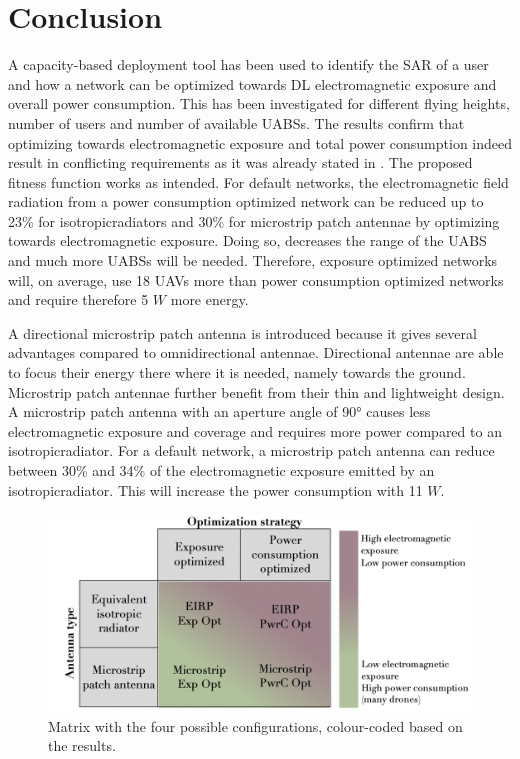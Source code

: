 \documentclass[twocolumn]{phdsymp} %
\begin{document}
\section{Conclusion}

A capacity-based deployment tool has been used to identify the \gls{SAR} of a user and how a network can be optimized 
towards \gls{DL} electromagnetic exposure and overall power consumption. This has been investigated for different flying heights,
number of users and number of available \gls{UABS}s.
The  results confirm that optimizing towards electromagnetic exposure and total power consumption indeed result in 
conflicting requirements as it was already stated in  \cite{J1}. The proposed fitness function works as intended. 
For default networks, the electromagnetic field radiation from a
power consumption optimized network can be reduced up to 23\% for \gls{isotropicradiator}s and 30\% for microstrip patch antennae 
by optimizing towards electromagnetic exposure. Doing so, decreases the range of the \gls{UABS} and much more \gls{UABS}s will be needed. 
Therefore, exposure optimized networks will, on average, use 18 \gls{UAV}s more than power consumption optimized networks
and require therefore 5 $W$ more energy.

A directional microstrip patch antenna is introduced because it gives several advantages compared to omnidirectional antennae.
Directional antennae are able to focus their energy there where it is needed, namely towards the ground. Microstrip patch antennae 
further benefit from their thin and lightweight design. 
A microstrip patch antenna with an aperture  angle of \ang{90} causes less electromagnetic exposure and coverage and requires more power compared to an \gls{isotropicradiator}.
For a default network, a microstrip patch antenna can reduce between 30\% and 34\% of the electromagnetic exposure 
emitted by an \gls{isotropicradiator}. This will increase the power consumption with 11 $W$.
\begin{figure}[hb!]
\centering
  \includegraphics[width=0.8\linewidth]{../images/fourCasesMatrixSol.png}
  \caption{Matrix with the four possible configurations, colour-coded based on the results.}
  \label{fig:resultIllustration}
\end{figure}
\end{document}
